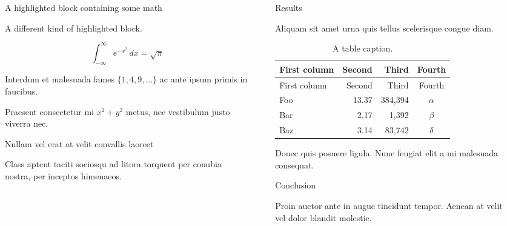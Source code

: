 \documentclass[final]{beamer}
\newlength{\sepwidth}
\newlength{\colwidth}
\newcommand{\separatorcolumn}{\begin{column}{\sepwidth}\end{column}}
\begin{document}
\begin{frame}[t,fragile]
\begin{columns}[t]
\begin{column}{\colwidth}

\begin{exampleblock}{A highlighted block containing some math}

A different kind of highlighted block.

\[
\int_{-\infty}^{\infty} e^{-x^2}\,dx = \sqrt{\pi}
\]

Interdum et malesuada fames \(\{1, 4, 9, \ldots\}\) ac ante ipsum primis
in faucibus.


Praesent consectetur mi \(x^2 + y^2\) metus, nec vestibulum justo
viverra nec.

\end{exampleblock}

\begin{block}{Nullam vel erat at velit convallis laoreet}

Class aptent taciti sociosqu ad litora torquent per conubia nostra, per
inceptos himenaeos.

\end{block}

\end{column}

\separatorcolumn

\begin{column}{\colwidth}

\begin{block}{Results}

Aliquam sit amet urna quis tellus scelerisque congue diam.

\begin{longtable}[]{@{}lrrc@{}}
\caption{A table caption.}\tabularnewline
\toprule\noalign{}
First column & Second & Third & Fourth \\
\midrule\noalign{}
\endfirsthead
\toprule\noalign{}
First column & Second & Third & Fourth \\
\midrule\noalign{}
\endhead
\bottomrule\noalign{}
\endlastfoot
Foo & 13.37 & 384,394 & \(\alpha\) \\
Bar & 2.17 & 1,392 & \(\beta\) \\
Baz & 3.14 & 83,742 & \(\delta\) \\
\end{longtable}

Donec quis posuere ligula. Nunc feugiat elit a mi malesuada consequat.

\end{block}

\begin{block}{Conclusion}

Proin auctor ante in augue tincidunt tempor. Aenean at velit vel dolor
blandit molestie.

\end{block}

\end{column}

		\separatorcolumn
	\end{columns}
\end{frame}
\end{document}
